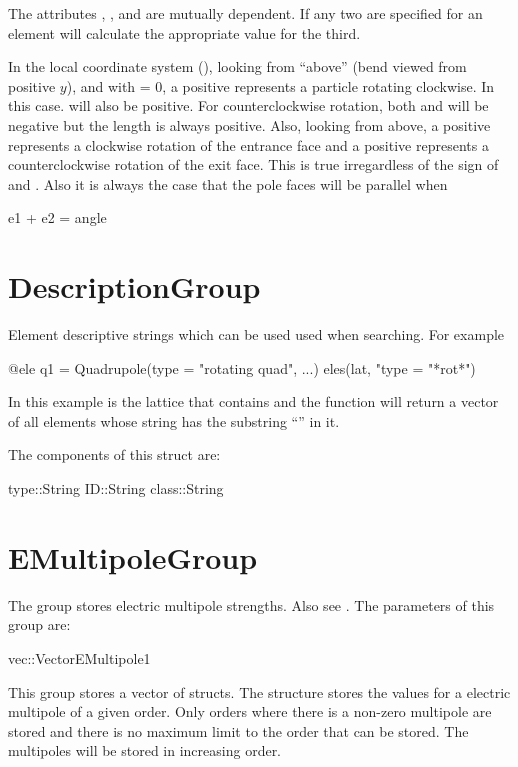 
The attributes , , and  are mutually dependent. If any two are specified for
an element \accellat will calculate the appropriate value for the third.

In the local coordinate system (), looking from ``above'' (bend viewed from positive
$y$), and with  = 0, a positive  represents a particle rotating clockwise. In
this case.  will also be positive. For counterclockwise rotation, both  and 
will be negative but the length  is always positive. Also, looking from above, a positive
 represents a clockwise rotation of the entrance face and a positive  represents a
counterclockwise rotation of the exit face. This is true irregardless of the sign of  and
. Also it is always the case that the pole faces will be parallel when
\begin{example}
  e1 + e2 = angle
\end{example}

\section{DescriptionGroup}
\label{s:descrip.g}

Element descriptive strings which can be used used when searching. For example
\begin{example}
  @ele q1 = Quadrupole(type = "rotating quad", ...)
  eles(lat, "type = "*rot*")
\end{example}
In this example  is the lattice that contains  and the  function
will return a vector of all elements whose  string has the substring ``''
in it.

The components of this struct are:
\begin{example}
  type::String 
  ID::String 
  class::String 
\end{example}

\section{EMultipoleGroup}
\label{s:emultipole.g}

The  group stores electric multipole strengths. Also see .
The parameters of this group are:
\begin{example}
  vec::Vector{EMultipole1}
\end{example}
This group stores a vector of  structs.
The  structure stores the values for a electric multipole of a given order.
Only orders where there is a non-zero multipole are stored and there is no maximum limit to the 
order that can be stored. The multipoles will be stored in increasing order.

